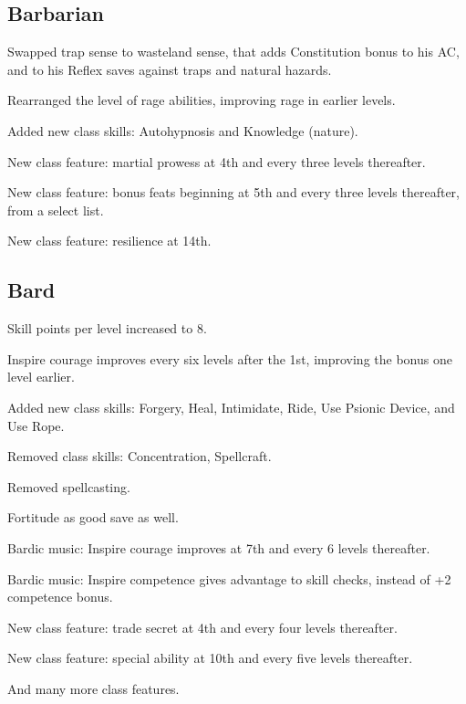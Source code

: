 \subsection{Barbarian}
\begin{itemize*}
\item Swapped trap sense to wasteland sense, that adds Constitution bonus to his AC, and to his Reflex saves against traps and natural hazards.
\item Rearranged the level of rage abilities, improving rage in earlier levels.
\item Added new class skills: Autohypnosis and Knowledge (nature).
\item New class feature: martial prowess at 4th and every three levels thereafter.
\item New class feature: bonus feats beginning at 5th and every three levels thereafter, from a select list.
\item New class feature: resilience at 14th.
\end{itemize*}

\subsection{Bard}
\begin{itemize*}
\item Skill points per level increased to 8.
\item Inspire courage improves every six levels after the 1st, improving the bonus one level earlier.
\item Added new class skills: Forgery, Heal, Intimidate, Ride, Use Psionic Device, and Use Rope.
\item Removed class skills: Concentration, Spellcraft.
\item Removed spellcasting.
\item Fortitude as good save as well.
\item Bardic music: Inspire courage improves at 7th and every 6 levels thereafter.
\item Bardic music: Inspire competence gives advantage to skill checks, instead of +2 competence bonus.
\item New class feature: trade secret at 4th and every four levels thereafter.
\item New class feature: special ability at 10th and every five levels thereafter.
\item And many more class features.
\end{itemize*}

